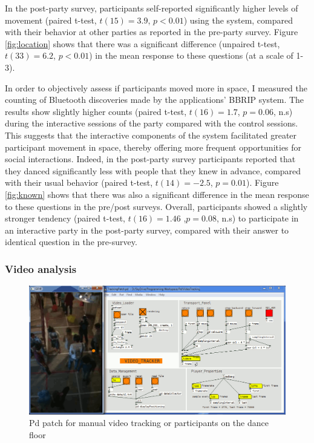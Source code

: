 \documentclass[a4paper,11pt]{article}
\begin{document}
{In the post-party survey, participants self-reported significantly higher levels of movement (paired t-test, $t(15)=3.9$, $p<0.01$) using the system, compared with their behavior at other parties as reported in the pre-party survey.
Figure \ref{fig:location} shows that there was a significant difference (unpaired t-test, $t(33)=6.2$, $p<0.01$) in the mean response to these questions (at a scale of 1-3).

In order to objectively assess if participants moved more in space, I measured the counting of Bluetooth discoveries made by the applications' BBRIP system.
The results show slightly higher counts (paired t-test, $t(16)=1.7$, $p=0.06$, n.s) during the interactive sessions of the party compared with the control sessions.
This suggests that the interactive components of the system facilitated greater participant movement in space, thereby offering more frequent opportunities for social interactions.
Indeed, in the post-party survey participants reported that they danced significantly less with people that they knew in advance, compared with their usual behavior (paired t-test, $t(14)=-2.5$, $p=0.01$).
Figure \ref{fig:known} shows that there was also a significant difference in the mean response to these questions in the pre/post surveys.
Overall, participants showed a slightly stronger tendency (paired t-test, $t(16)=1.46$ ,$p=0.08$, n.s) to participate in an interactive party in the post-party survey, compared with their answer to identical question in the pre-survey.

\subsubsection{Video analysis}\label{exp1:results:video}

\begin{figure}[!htb]
	\includegraphics[width=\linewidth]{tracking}
        \caption{Pd patch for manual video tracking or participants on the dance floor}\label{fig:tracking}
\end{figure}

}
\end{document}
